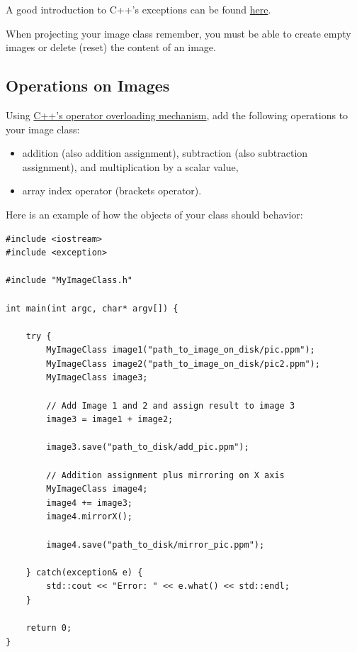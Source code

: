 \documentclass[11pt]{article}
\begin{document}
A good introduction to C++'s exceptions can be found \href{http://www.cplusplus.com/doc/tutorial/exceptions/}{here}.

When projecting your image class remember, you must be able to create empty images or delete (reset) the content of an image.

\subsection{Operations on Images}
\vspace{-3mm}
Using \href{https://en.cppreference.com/w/cpp/language/operators}{C++'s operator overloading mechanism}, add the following operations to your image class:
\begin{itemize}
\item addition (also addition assignment), subtraction (also subtraction assignment), and multiplication by a scalar value,
\item array index operator (brackets operator).  
\end{itemize}

Here is an example of how the objects of your class should behavior:

\scriptsize
\begin{verbatim}
#include <iostream>
#include <exception>

#include "MyImageClass.h"

int main(int argc, char* argv[]) {

    try {
        MyImageClass image1("path_to_image_on_disk/pic.ppm");
        MyImageClass image2("path_to_image_on_disk/pic2.ppm");
        MyImageClass image3;

        // Add Image 1 and 2 and assign result to image 3
        image3 = image1 + image2;

        image3.save("path_to_disk/add_pic.ppm");

        // Addition assignment plus mirroring on X axis
        MyImageClass image4;
        image4 += image3;
        image4.mirrorX();

        image4.save("path_to_disk/mirror_pic.ppm");

    } catch(exception& e) {
        std::cout << "Error: " << e.what() << std::endl;
    }

    return 0;
}
\end{verbatim}
\normalsize
\end{document}
